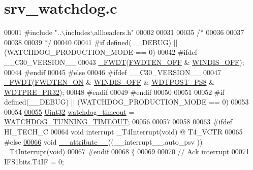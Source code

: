 \hypertarget{a00066_source}{\section{srv\+\_\+watchdog.\+c}
\label{a00066_source}
}

\begin{DoxyCode}
00001 \textcolor{preprocessor}{#include "..\(\backslash\)includes\(\backslash\)allheaders.h"} 
00002 
00031 
00035 \textcolor{comment}{/*}
00036 \textcolor{comment}{}
00037 \textcolor{comment}{ }
00038 \textcolor{comment}{}
00039 \textcolor{comment}{ */}
00040 
00041 \textcolor{preprocessor}{#if defined(\_\_DEBUG) || (WATCHDOG\_PRODUCTION\_MODE == 0)}
00042 \textcolor{preprocessor}{#ifdef \_\_C30\_VERSION\_\_}
00043 \hyperlink{a00015_af24dea78c3111674d8bd9d621f1023ad}{\_FWDT}(\hyperlink{a00015_a251770e7a21c7f3c211849959dd26d1c}{FWDTEN\_OFF} & \hyperlink{a00015_afdc8e2e610d007e1c289198581c01df4}{WINDIS\_OFF});
00044 \textcolor{preprocessor}{#endif}
00045 \textcolor{preprocessor}{#else}
00046 \textcolor{preprocessor}{#ifdef \_\_C30\_VERSION\_\_}
00047 \hyperlink{a00015_af24dea78c3111674d8bd9d621f1023ad}{\_FWDT}(\hyperlink{a00015_a8e573d695a5bcdcd012a407a4dd588d5}{FWDTEN\_ON} & \hyperlink{a00015_afdc8e2e610d007e1c289198581c01df4}{WINDIS\_OFF} & \hyperlink{a00015_af4c27494e74759f053e8762756425243}{WDTPOST\_PS8} & 
      \hyperlink{a00015_a7ca5d56a666b5eec4193af43aaf64a45}{WDTPRE\_PR32});
00048 \textcolor{preprocessor}{#endif}
00049 \textcolor{preprocessor}{#endif}
00050 
00051 
00052 \textcolor{preprocessor}{#if defined(\_\_DEBUG) || (WATCHDOG\_PRODUCTION\_MODE == 0)}
00053 
00054 
\hypertarget{a00066_source_l00055}{}\hyperlink{a00066_a159d343205105c86a6dec5da26cfdfe0}{00055} \hyperlink{a00072_aba99025e657f892beb7ff31cecf64653}{Uint32} \hyperlink{a00066_a159d343205105c86a6dec5da26cfdfe0}{watchdog\_timeout} = \hyperlink{a00067_aaf1a99e6db8062353e5f10d1f7d02938}{WATCHDOG\_TUNNING\_TIMEOUT};
00056 
00057 
00058 
00063 \textcolor{preprocessor}{#ifdef HI\_TECH\_C}
00064 \textcolor{keywordtype}{void} interrupt \_T4Interrupt(\textcolor{keywordtype}{void}) @ T4\_VCTR
00065 \textcolor{preprocessor}{#else}
\hypertarget{a00066_source_l00066}{}\hyperlink{a00066_a2068c3c2584547dbc1c8b9bca2d55b18}{00066} \textcolor{keywordtype}{void} \hyperlink{a00066_a2068c3c2584547dbc1c8b9bca2d55b18}{\_\_attribute\_\_}((\_\_interrupt\_\_,auto\_psv )) \_T4Interrupt(\textcolor{keywordtype}{void})
00067 \textcolor{preprocessor}{#endif}
00068 \{
00069 
00070     \textcolor{comment}{// Ack interrupt}
00071     IFS1bits.T4IF = 0;

\end{DoxyCode}

